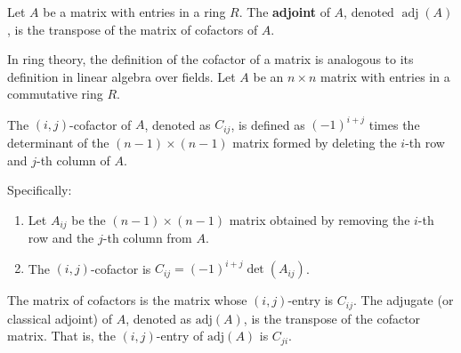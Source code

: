 \begin{definition}[Adjoint of $A$]
Let $A$ be a matrix with entries in a ring $R$. The \textbf{adjoint} of $A$, denoted $\operatorname{adj}(A)$, is the transpose of the matrix of cofactors of $A$.
\end{definition}
In ring theory, the definition of the cofactor of a matrix is analogous to its definition in linear algebra over fields. Let $A$ be an $n \times n$ matrix with entries in a commutative ring $R$.

The $(i, j)$-cofactor of $A$, denoted as $C_{ij}$, is defined as $(-1)^{i+j}$ times the determinant of the $(n-1) \times (n-1)$ matrix formed by deleting the $i$-th row and $j$-th column of $A$.

Specifically:

\begin{enumerate}
	\item Let $A_{ij}$ be the $(n-1) \times (n-1)$ matrix obtained by removing the $i$-th row and the $j$-th column from $A$.
	\item The $(i, j)$-cofactor is $C_{ij} = (-1)^{i+j} \det(A_{ij})$.
\end{enumerate}

The matrix of cofactors is the matrix whose $(i, j)$-entry is $C_{ij}$. The adjugate (or classical adjoint) of $A$, denoted as $\text{adj}(A)$, is the transpose of the cofactor matrix. That is, the $(i, j)$-entry of $\text{adj}(A)$ is $C_{ji}$.
